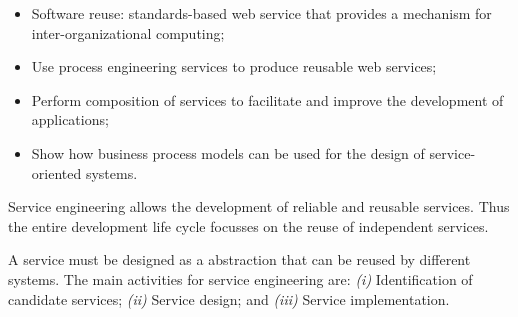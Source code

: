 \begin{itemize}
  \item Software reuse: standards-based web service that provides a mechanism
  for inter-organizational computing;
  \item Use process engineering services to produce reusable web services;
  \item Perform composition of services to facilitate and improve the
  development of applications;
  \item Show how business process models can be used for the design of
  service-oriented systems.
\end{itemize}

Service engineering allows the development of reliable and
reusable services. Thus the entire development life cycle focusses on the
reuse of independent services. 



A service must be designed as a abstraction that can be reused by different
systems. The main activities for service engineering are: \textit{(i)}
Identification of candidate services; \textit{(ii)} Service design; and
\textit{(iii)} Service implementation.




